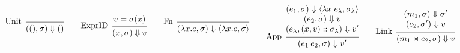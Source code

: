 \documentclass{article}
\theoremstyle{definition}
\newcommand*{\cons}{::}
\newcommand*{\ctx}{\sigma}
\newcommand*{\semarrow}{\Downarrow}
\newcommand*{\link}[2]{{#1}\rtimes{#2}}
\begin{document}
\begin{figure}[h!]
  \footnotesize
  \begin{flushright}
    \fbox{$(e,\ctx)\semarrow v$ and $(m,\ctx)\semarrow\ctx$}
  \end{flushright}
  \centering
  \vspace{0pt} %
  \[
    \begin{prooftree}
      \infer[left label=Unit]0{
      ((),\ctx)
      \semarrow
      ()
      }
    \end{prooftree}\qquad
    \begin{prooftree}
      \hypo{v=\ctx(x)}
      \infer[left label=ExprID]1{
      (x, \ctx)
      \semarrow
      v
      }
    \end{prooftree}\qquad
    \begin{prooftree}
      \infer[left label=Fn]0{
      (\lambda x.e, \ctx)
      \semarrow
      \langle\lambda x.e, \ctx\rangle
      }
    \end{prooftree}\qquad
    \begin{prooftree}
      \hypo{
        \begin{matrix}
          (e_{1}, \ctx)
          \semarrow
          \langle\lambda x.e_{\lambda}, \ctx_{\lambda}\rangle \\
          (e_{2}, \ctx)
          \semarrow
          v                                                   \\
          (e_{\lambda}, (x, v)\cons \ctx_{\lambda})
          \semarrow
          v'
        \end{matrix}
      }
      \infer[left label={App}]1{
      (e_{1}\:e_{2}, \ctx)
      \semarrow
      v'
      }
    \end{prooftree}\qquad
    \begin{prooftree}
      \hypo{
        \begin{matrix}
          (m_{1}, \ctx)
          \semarrow
          \ctx' \\
          (e_{2}, \ctx')
          \semarrow
          v
        \end{matrix}
      }
      \infer[left label=Link]1{
      (\link{m_{1}}{e_{2}}, \ctx)
      \semarrow
      v
      }
    \end{prooftree}
  \]


\end{figure}
\end{document}
